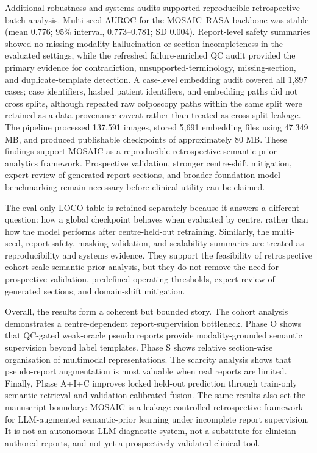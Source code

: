 Additional robustness and systems audits supported reproducible retrospective batch analysis. Multi-seed AUROC for the MOSAIC--RASA backbone was stable (mean 0.776; 95\% interval, 0.773--0.781; SD 0.004). Report-level safety summaries showed no missing-modality hallucination or section incompleteness in the evaluated settings, while the refreshed failure-enriched QC audit provided the primary evidence for contradiction, unsupported-terminology, missing-section, and duplicate-template detection. A case-level embedding audit covered all 1,897 cases; case identifiers, hashed patient identifiers, and embedding paths did not cross splits, although repeated raw colposcopy paths within the same split were retained as a data-provenance caveat rather than treated as cross-split leakage. The pipeline processed 137,591 images, stored 5,691 embedding files using 47.349 MB, and produced publishable checkpoints of approximately 80 MB. These findings support MOSAIC as a reproducible retrospective semantic-prior analytics framework. Prospective validation, stronger centre-shift mitigation, expert review of generated report sections, and broader foundation-model benchmarking remain necessary before clinical utility can be claimed.

The eval-only LOCO table is retained separately because it answers a different question: how a global checkpoint behaves when evaluated by centre, rather than how the model performs after centre-held-out retraining. Similarly, the multi-seed, report-safety, masking-validation, and scalability summaries are treated as reproducibility and systems evidence. They support the feasibility of retrospective cohort-scale semantic-prior analysis, but they do not remove the need for prospective validation, predefined operating thresholds, expert review of generated sections, and domain-shift mitigation.

\FloatBarrier

Overall, the results form a coherent but bounded story. The cohort analysis demonstrates a centre-dependent report-supervision bottleneck. Phase O shows that QC-gated weak-oracle pseudo reports provide modality-grounded semantic supervision beyond label templates. Phase S shows relative section-wise organisation of multimodal representations. The scarcity analysis shows that pseudo-report augmentation is most valuable when real reports are limited. Finally, Phase A+I+C improves locked held-out prediction through train-only semantic retrieval and validation-calibrated fusion. The same results also set the manuscript boundary: MOSAIC is a leakage-controlled retrospective framework for LLM-augmented semantic-prior learning under incomplete report supervision. It is not an autonomous LLM diagnostic system, not a substitute for clinician-authored reports, and not yet a prospectively validated clinical tool.

